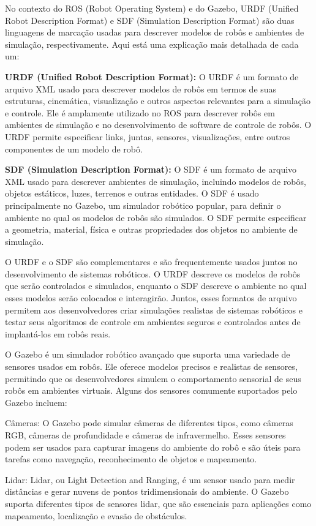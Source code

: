 No contexto do ROS (Robot Operating System) e do Gazebo, URDF (Unified Robot Description Format) e SDF (Simulation Description Format) são duas linguagens de marcação usadas para descrever modelos de robôs e ambientes de simulação, respectivamente. Aqui está uma explicação mais detalhada de cada um:

\textbf{URDF (Unified Robot Description Format):} O URDF é um formato de arquivo XML usado para descrever modelos de robôs em termos de suas estruturas, cinemática, visualização e outros aspectos relevantes para a simulação e controle. Ele é amplamente utilizado no ROS para descrever robôs em ambientes de simulação e no desenvolvimento de software de controle de robôs. O URDF permite especificar links, juntas, sensores, visualizações, entre outros componentes de um modelo de robô.

\textbf{SDF (Simulation Description Format):} O SDF é um formato de arquivo XML usado para descrever ambientes de simulação, incluindo modelos de robôs, objetos estáticos, luzes, terrenos e outras entidades. O SDF é usado principalmente no Gazebo, um simulador robótico popular, para definir o ambiente no qual os modelos de robôs são simulados. O SDF permite especificar a geometria, material, física e outras propriedades dos objetos no ambiente de simulação.

O URDF e o SDF são complementares e são frequentemente usados juntos no desenvolvimento de sistemas robóticos. O URDF descreve os modelos de robôs que serão controlados e simulados, enquanto o SDF descreve o ambiente no qual esses modelos serão colocados e interagirão. Juntos, esses formatos de arquivo permitem aos desenvolvedores criar simulações realistas de sistemas robóticos e testar seus algoritmos de controle em ambientes seguros e controlados antes de implantá-los em robôs reais.

O Gazebo é um simulador robótico avançado que suporta uma variedade de sensores usados em robôs. Ele oferece modelos precisos e realistas de sensores, permitindo que os desenvolvedores simulem o comportamento sensorial de seus robôs em ambientes virtuais. Alguns dos sensores comumente suportados pelo Gazebo incluem:

Câmeras: O Gazebo pode simular câmeras de diferentes tipos, como câmeras RGB, câmeras de profundidade e câmeras de infravermelho. Esses sensores podem ser usados para capturar imagens do ambiente do robô e são úteis para tarefas como navegação, reconhecimento de objetos e mapeamento.

Lidar: Lidar, ou Light Detection and Ranging, é um sensor usado para medir distâncias e gerar nuvens de pontos tridimensionais do ambiente. O Gazebo suporta diferentes tipos de sensores lidar, que são essenciais para aplicações como mapeamento, localização e evasão de obstáculos.

